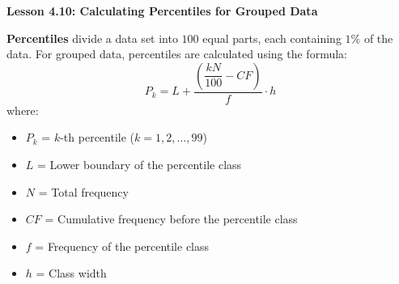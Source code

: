 \begin{center}
\textbf{Lesson 4.10: Calculating Percentiles for Grouped Data}
\end{center}

\vspace*{-1.5ex}

\noindent \textbf{Percentiles} divide a data set into \(100\) equal parts, each containing \(1\%\) of the data. For grouped data, percentiles are calculated using the formula:  
\[
P_k = L + \dfrac{\left(\dfrac{kN}{100} - CF\right)}{f} \cdot h
\]
where:  
\begin{itemize}
    \item \(P_k\) = \(k\)-th percentile (\(k = 1, 2, \dots, 99\))
    \item \(L\) = Lower boundary of the percentile class
    \item \(N\) = Total frequency
    \item \(CF\) = Cumulative frequency before the percentile class
    \item \(f\) = Frequency of the percentile class
    \item \(h\) = Class width
\end{itemize}


